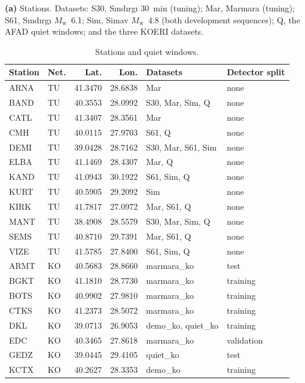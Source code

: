 \documentclass[11pt,a4paper]{article}
\newcommand{\Mw}{$M_\mathrm{w}$}
\newcommand{\panel}[1]{\par\smallskip\noindent\textbf{(#1)}\enskip}
\begin{document}
\begin{table}[htbp]
  \centering\small
  \caption{Stations and quiet windows.}\label{t:stations}
  \panel{a} Stations. Datasets: S30, S\i{}nd\i{}rg\i{} 30~min (tuning);
  Mar, Marmara (tuning); S61, S\i{}nd\i{}rg\i{} \Mw{}~6.1; Sim, Simav
  \Mw{}~4.8 (both development sequences); Q, the AFAD quiet windows; and the three KOERI
  datasets.\par\smallskip
  \begin{tabular}{@{}llrrll@{}}
    \toprule
    Station & Net. & Lat. & Lon. & Datasets & Detector split \\
    \midrule
    ARNA & TU & 41.3470 & 28.6838 & Mar & none \\
    BAND & TU & 40.3553 & 28.0992 & S30, Mar, Sim, Q & none \\
    CATL & TU & 41.3407 & 28.3561 & Mar & none \\
    CMH  & TU & 40.0115 & 27.9703 & S61, Q & none \\
    DEMI & TU & 39.0428 & 28.7162 & S30, Mar, S61, Sim & none \\
    ELBA & TU & 41.1469 & 28.4307 & Mar, Q & none \\
    KAND & TU & 41.0943 & 30.1922 & S61, Sim, Q & none \\
    KURT & TU & 40.5905 & 29.2092 & Sim & none \\
    KIRK & TU & 41.7817 & 27.0972 & Mar, S61, Q & none \\
    MANT & TU & 38.4908 & 28.5579 & S30, Mar, Sim, Q & none \\
    SEMS & TU & 40.8710 & 29.7391 & Mar, S61, Q & none \\
    VIZE & TU & 41.5785 & 27.8400 & S61, Sim, Q & none \\
    \addlinespace
    ARMT & KO & 40.5683 & 28.8660 & marmara\_ko & test \\
    BGKT & KO & 41.1810 & 28.7730 & marmara\_ko & training \\
    BOTS & KO & 40.9902 & 27.9810 & marmara\_ko & training \\
    CTKS & KO & 41.2373 & 28.5072 & marmara\_ko & training \\
    DKL  & KO & 39.0713 & 26.9053 & demo\_ko, quiet\_ko & training \\
    EDC  & KO & 40.3465 & 27.8618 & marmara\_ko & validation \\
    GEDZ & KO & 39.0445 & 29.4105 & quiet\_ko & test \\
    KCTX & KO & 40.2627 & 28.3353 & demo\_ko & training \\

\end{tabular}
\end{table}
\end{document}
